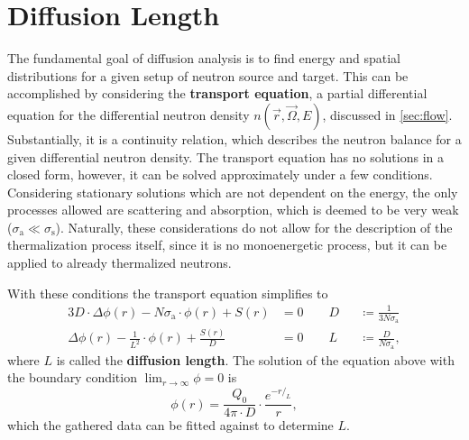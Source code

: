 \section{Diffusion Length}
The fundamental goal of diffusion analysis is to find energy and spatial distributions for a given setup of neutron source and target.
This can be accomplished by considering the \textbf{transport equation}, a partial differential equation for the differential neutron density $n(\vec{r}, \vec{\Omega}, E)$, discussed in \autoref{sec:flow}.
Substantially, it is a continuity relation, which describes the neutron balance for a given differential neutron density.
The transport equation has no solutions in a closed form, however, it can be solved approximately under a few conditions.
Considering stationary solutions which are not dependent on the energy, the only processes allowed are scattering and absorption, which is deemed to be very weak ($\sigma_\text{a}\ll \sigma_\text{s}$).
Naturally, these considerations do not allow for the description of the thermalization process itself, since it is no monoenergetic process, but it can be applied to already thermalized neutrons.

With these conditions the transport equation simplifies to
\begin{alignat*}{3}
	D\cdot\Delta\phi(r) - N\sigma_\text{a}\cdot\phi(r) + S(r) &= 0 \qquad D&&\coloneqq\frac{1}{3N\sigma_\text{a}}\\
	\Delta\phi(r) - \frac{1}{L^2}\cdot\phi(r) + \frac{S(r)}{D} &= 0 \qquad L&&\coloneqq\frac{D}{N\sigma_\text{a}},
\end{alignat*}
where $L$ is called the \textbf{diffusion length}.
The solution of the equation above with the boundary condition $\lim_{r\rightarrow\infty}\phi = 0$ is
\begin{equation}\label{eq:sol}
	\phi(r) = \frac{Q_0}{4\pi\cdot D}\cdot \frac{e^{-r/_L}}{r},
\end{equation}
which the gathered data can be fitted against to determine $L$.
